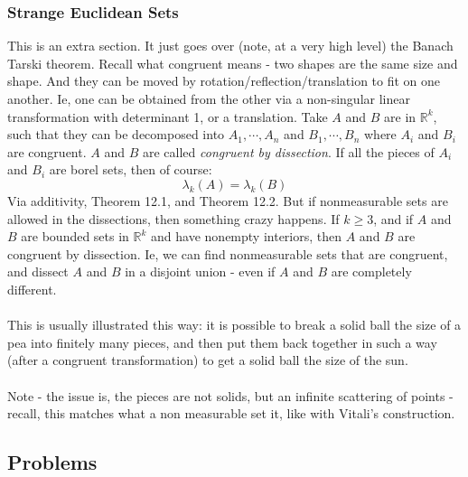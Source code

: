 \documentclass[12pt,a4paper]{article}
\newcommand{\1}[1]{\mathbbm{1}\left\{ #1 \right\}}
\newcommand{\R}{\mathbb{R}}
\begin{document}
\subsubsection{Strange Euclidean Sets}
This is an extra section. It just goes over (note, at a very high level) the Banach Tarski theorem. Recall what congruent means - two shapes are the same size and shape. And they can be moved by rotation/reflection/translation to fit on one another. Ie, one can be obtained from the other via a non-singular linear transformation with determinant 1, or a translation. Take $A$ and $B$ are in $\R^k$, such that they can be decomposed into $A_1, \cdots, A_n$ and $B_1, \cdots, B_n$ where $A_i$ and $B_i$ are congruent. $A$ and $B$ are called \textit{congruent by dissection}. If all the pieces of $A_i$ and $B_i$ are borel sets, then of course:
$$
	\lambda_k(A) = \lambda_k(B)
$$
Via additivity, Theorem 12.1, and Theorem 12.2. But if nonmeasurable sets are allowed in the dissections, then something crazy happens. If $k \geq 3$, and if $A$ and $B$ are bounded sets in $\R^k$ and have nonempty interiors, then $A$ and $B$ are congruent by dissection. Ie, we can find nonmeasurable sets that are congruent, and dissect $A$ and $B$ in a disjoint union - even if $A$ and $B$ are completely different.
\\\\
This is usually illustrated this way: it is possible to break a solid ball the size of a pea into finitely many pieces, and then put them back together in such a way (after a congruent transformation) to get a solid ball the size of the sun.
\\\\
Note - the issue is, the pieces are not solids, but an infinite scattering of points - recall, this matches what a non measurable set it, like with Vitali's construction.

\subsection{Problems}
\end{document}
